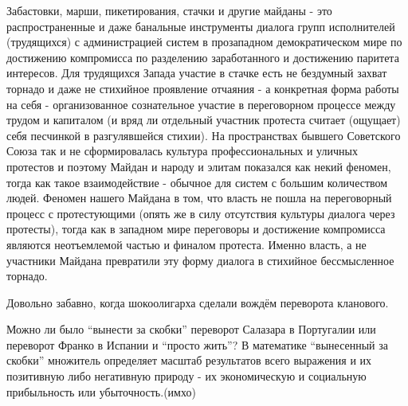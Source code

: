 \begin{itemize}

Забастовки, марши, пикетирования, стачки и другие майданы - это
распространенные и даже банальные инструменты диалога групп исполнителей
(трудящихся) с администрацией систем в прозападном демократическом мире по
достижению компромисса по разделению заработанного и достижению паритета
интересов. Для трудящихся Запада участие в стачке есть не бездумный захват
торнадо и даже не стихийное проявление отчаяния - а конкретная форма работы на
себя - организованное сознательное участие в переговорном процессе между трудом
и капиталом (и вряд ли отдельный участник протеста считает (ощущает) себя
песчинкой в разгулявшейся стихии). На пространствах бывшего Советского Союза
так и не сформировалась культура профессиональных и уличных протестов и поэтому
Майдан и народу и элитам показался как некий феномен, тогда как такое
взаимодействие - обычное для систем с большим количеством людей. Феномен нашего
Майдана в том, что власть не пошла на переговорный процесс с протестующими
(опять же в силу отсутствия культуры диалога через протесты), тогда как в
западном мире переговоры и достижение компромисса являются неотъемлемой частью
и финалом протеста. Именно власть, а не участники Майдана превратили эту форму
диалога в стихийное бессмысленное торнадо.

Довольно забавно, когда шокоолигарха сделали вождём переворота кланового.


Можно ли было \enquote{вынести за скобки} переворот Салазара в Португалии или переворот
Франко в Испании и \enquote{просто жить}? В математике \enquote{вынесенный за скобки} множитель
определяет масштаб результатов всего выражения и их позитивную либо негативную
природу - их экономическую и социальную прибыльность или убыточность.(имхо)


\end{itemize} %
